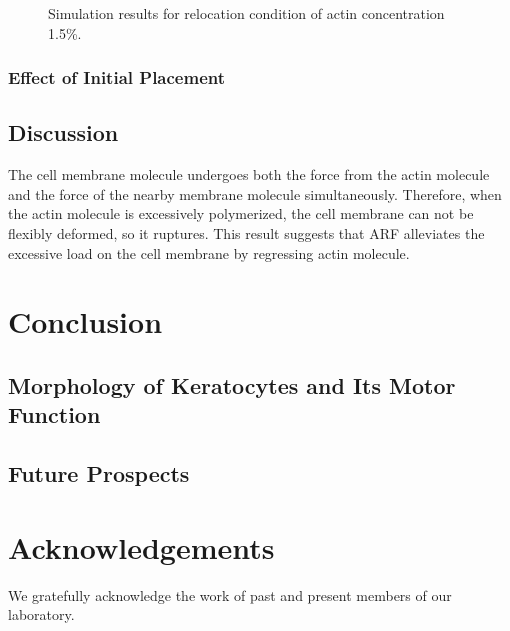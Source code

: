 \documentclass[a4paper,12pt]{book}
\begin{document}
\begin{figure}[h]
{ }%
 \caption{Simulation results for relocation condition of actin concentration 1.5\%.}
 \label{fig:res4}
\end{figure}


\subsection{Effect of Initial Placement}


\section{Discussion}
The cell membrane molecule undergoes both the force from the actin molecule and the force of the nearby membrane molecule simultaneously. Therefore, when the actin molecule is excessively polymerized, the cell membrane can not be flexibly deformed, so it ruptures. This result suggests that ARF alleviates the excessive load on the cell membrane by regressing actin molecule.

\chapter{Conclusion}
\section{Morphology of Keratocytes and Its Motor Function}

\section{Future Prospects}

\chapter*{Acknowledgements}
We gratefully acknowledge the work of past and present members of our laboratory.




\end{document}
